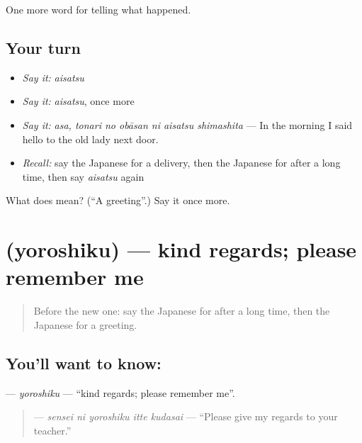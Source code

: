 \begin{grammarlens}[title={What you've built}]
One more word for telling what happened.
\end{grammarlens}

\subsection*{Your turn}
\begin{itemize}
\raggedright
  \item \emph{Say it:} \emph{aisatsu}
  \item \emph{Say it:} \emph{aisatsu}, once more
  \item \emph{Say it:} \emph{asa, tonari no obāsan ni aisatsu shimashita} — In the morning I said hello to the old lady next door.
  \item \emph{Recall:} say the Japanese for a delivery, then the Japanese for after a long time, then say \emph{aisatsu} again
\end{itemize}

\begin{tcolorbox}[breakable,colback=teal!4,colframe=teal!35!black,title={Before you move on}]
What does  mean? (\textquotedblleft{}A greeting\textquotedblright{}.) Say it once more.
\end{tcolorbox}
\section[\texorpdfstring{\ja{よろしく} (yoroshiku)}{よろしく (yoroshiku)}]{ (yoroshiku) — kind regards; please remember me}

\label{lesson:JA-C306-yoroshiku}



\begin{quote}
Before the new one: say the Japanese for after a long time, then the Japanese for a greeting.
\end{quote}

\subsection*{You'll want to know: }
\textbf{} — \emph{yoroshiku} — \textquotedblleft{}kind regards; please remember me\textquotedblright{}.

\begin{quote}
\textbf{   } — \emph{sensei ni yoroshiku itte kudasai} — \textquotedblleft{}Please give my regards to your teacher.\textquotedblright{}
\end{quote}

